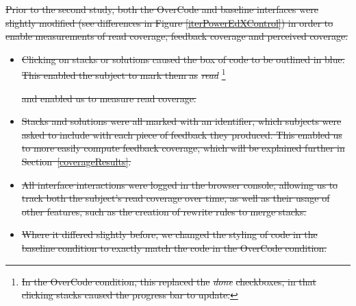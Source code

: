 \documentclass[12pt,twoside]{mitthesis}
\providecommand{\DIFdeltex}[1]{{\protect\color{red}\sout{#1}}}                      %
\providecommand{\DIFdelbegin}{} %
\providecommand{\DIFdel}[1]{\texorpdfstring{\DIFdeltex{#1}}{}} %
\begin{document}
{{{{{{{{{{\DIFdelbegin %
\DIFdel{Prior to the second study, both the OverCode and baseline interfaces were slightly modified (see differences in Figure \ref{iterPowerEdXControl}) in order to enable measurements of read coverage, feedback coverage and perceived coverage.
}%
 \begin{itemize} %
\item%
\DIFdel{Clicking on stacks or solutions caused the box of code to be outlined in blue. This enabled the subject to mark them as }\emph{\DIFdel{read}}%
\footnote{\DIFdel{In the OverCode condition, this replaced the }\emph{\DIFdel{done}} %
\DIFdel{checkboxes, in that clicking stacks caused the progress bar to update.}} %
\addtocounter{footnote}{-1}%
\DIFdel{and enabled us to measure read coverage.
}%
\item%
\DIFdel{Stacks and solutions were all marked with an identifier, which subjects were asked to include with each piece of feedback they produced. This enabled us to more easily compute feedback coverage, which will be explained further in Section~\ref{coverageResults}.
}%
\item%
\DIFdel{All interface interactions were logged in the browser console, allowing us to track both the subject's read coverage over time, as well as their usage of other features, such as the creation of rewrite rules to merge stacks.
}%
\item%
\DIFdel{Where it differed slightly before, we changed the styling of code in the baseline condition to exactly match the code in the OverCode condition.
}
 \end{itemize} %
}}}}}}}}}}
\end{document}
